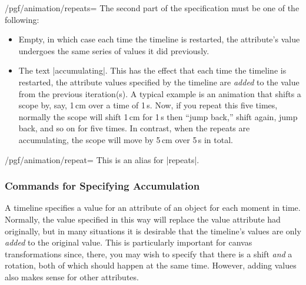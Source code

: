 \begin{key}{/pgf/animation/repeats=}
  The second part of the specification must be one of the following:
  \begin{itemize}
  \item Empty, in which case each time the timeline is restarted, the
    attribute's value undergoes the same series of values it did
    previously.
  \item The text |accumulating|. This has the effect that each time
    the timeline is restarted, the attribute values specified by the
    timeline are \emph{added} to the value from the previous
    iteration(s). A typical example is an animation that shifts a
    scope by, say, 1\,cm over a time of 1\,s. Now, if you repeat this
    five times, normally the scope will shift 1\,cm for 1\,s then
    ``jump back,'' shift again, jump back, and so on for five
    times. In contrast, when the repeats are accumulating, the scope
    will move by 5\,cm over 5\,s in total.    
\begin{codeexample}[width=2cm]
\end{codeexample}
\begin{codeexample}[width=2cm]
\end{codeexample}
  \end{itemize}
\end{key}

\begin{key}{/pgf/animation/repeat=}
  This is an alias for |repeats|.  
\end{key}



\subsubsection{Commands for Specifying Accumulation}

A timeline specifies a value for an attribute of an object for each
moment in time. Normally, the value specified in this way will replace
the value attribute had originally, but in many situations it is
desirable that the timeline's values are only \emph{added} to the
original value. This is particularly important for canvas
transformations since, there, you may wish to specify that there is a
shift \emph{and} a rotation, both of which should happen at the same
time. However, adding values also makes sense for other attributes.

